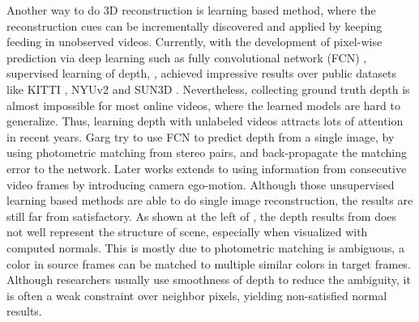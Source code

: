 Another way to do 3D reconstruction is learning based method, where the reconstruction cues can be incrementally discovered and applied by keeping feeding in unobserved videos. Currently, with the development of pixel-wise prediction via deep learning such as fully convolutional network (FCN) \cite{long2015fully}, supervised learning of depth, \eg \cite{eigen2014depth,ummenhofer2016demon}, achieved impressive results over public datasets like KITTI \cite{}, NYUv2 \cite{silberman2012indoor} and SUN3D \cite{xiao2013sun3d}. 
Nevertheless, collecting ground truth depth is almost impossible for most online videos, where the learned models are hard to generalize. 
Thus, learning depth with unlabeled videos attracts lots of attention in recent years.
Garg \etal \cite{godard2016unsupervised} try to use FCN to predict depth from a single image, by using photometric matching from stereo pairs, and back-propagate the matching error to the network. Later works \cite{zhou2017unsupervised,Vijayanarasimhan17} extends to using information from consecutive video frames by introducing camera ego-motion. 
Although those unsupervised learning based methods are able to do single image reconstruction, the results are still far from satisfactory. As shown at the left of , the depth results from \cite{zhou2017unsupervised} does not well represent the structure of scene, especially when visualized with computed normals. 
This is mostly due to photometric matching is ambiguous, \ie a color in source frames can be matched to multiple similar colors in target frames. Although researchers usually use smoothness of depth \cite{zhou2017unsupervised} to reduce the ambiguity, it is often a weak constraint over neighbor pixels, yielding non-satisfied normal results.

